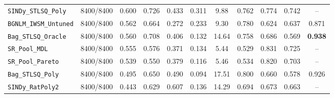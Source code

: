 \documentclass{article}
\begin{document}
\begin{table}[t]
{\begin{tabular}{lcccccccccc}
\texttt{SINDy\_STLSQ\_Poly} & 8400/8400 & 0.600 & 0.726 & 0.433 & 0.311 & 9.88 & 0.762 & 0.774 & 0.742 & -- \\
\texttt{BGNLM\_IWSM\_Untuned} & 8400/8400 & 0.562 & 0.664 & 0.272 & 0.233 & 9.30 & 0.780 & 0.624 & 0.637 & 0.871 \\
\texttt{Bag\_STLSQ\_Oracle} & 8400/8400 & 0.560 & 0.708 & 0.406 & 0.132 & 14.64 & 0.758 & 0.686 & 0.569 & \textbf{0.938} \\
\texttt{SR\_Pool\_MDL} & 8400/8400 & 0.555 & 0.576 & 0.371 & 0.134 & 5.44 & 0.529 & 0.831 & 0.725 & -- \\
\texttt{SR\_Pool\_Pareto} & 8400/8400 & 0.539 & 0.550 & 0.379 & 0.116 & 5.46 & 0.534 & 0.820 & 0.703 & -- \\
\texttt{Bag\_STLSQ\_Poly} & 8400/8400 & 0.495 & 0.650 & 0.490 & 0.094 & 17.51 & 0.800 & 0.660 & 0.578 & 0.926 \\
\texttt{SINDy\_RatPoly2} & 8400/8400 & 0.443 & 0.629 & 0.607 & 0.136 & 14.29 & 0.694 & 0.673 & 0.663 & -- \\
\bottomrule
\end{tabular}%
}
\end{table}
\end{document}
